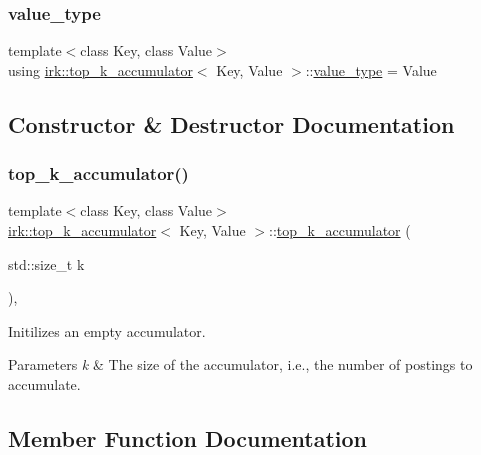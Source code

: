 \subsubsection{\texorpdfstring{value\+\_\+type}{value\_type}}
{\footnotesize\ttfamily template$<$class Key, class Value$>$ \\
using \mbox{\hyperlink{classirk_1_1top__k__accumulator}{irk\+::top\+\_\+k\+\_\+accumulator}}$<$ Key, Value $>$\+::\mbox{\hyperlink{classirk_1_1top__k__accumulator_ad96657e9478dcbab995f3bf38954b5bd}{value\+\_\+type}} =  Value}



\subsection{Constructor \& Destructor Documentation}
\mbox{\label{classirk_1_1top__k__accumulator_a729944f89ec6c2085be96ad23ae9a727}} 
\subsubsection{\texorpdfstring{top\+\_\+k\+\_\+accumulator()}{top\_k\_accumulator()}}
{\footnotesize\ttfamily template$<$class Key, class Value$>$ \\
\mbox{\hyperlink{classirk_1_1top__k__accumulator}{irk\+::top\+\_\+k\+\_\+accumulator}}$<$ Key, Value $>$\+::\mbox{\hyperlink{classirk_1_1top__k__accumulator}{top\+\_\+k\+\_\+accumulator}} (\begin{DoxyParamCaption}\item[{std\+::size\+\_\+t}]{k }\end{DoxyParamCaption})\hspace{0.3cm}{\ttfamily [inline]}, {\ttfamily [explicit]}}



Initilizes an empty accumulator. 


\begin{DoxyParams}{Parameters}
{\em k} & The size of the accumulator, i.\+e., the number of postings to accumulate. \\
\hline
\end{DoxyParams}


\subsection{Member Function Documentation}
\mbox{\label{classirk_1_1top__k__accumulator_ae02e391e9bab8ce26fb9f5c7473a26d5}} 
